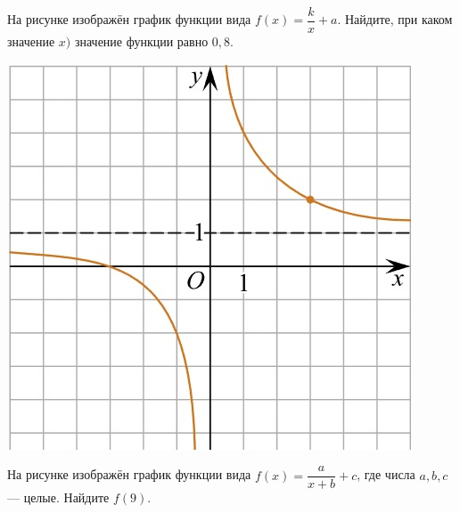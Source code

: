 \begin{class}[number=5]
	\begin{listofex}
		\newpage
		\item
		\begin{minipage}[t]{0.43\textwidth}
			На рисунке изображён график функции вида \(f(x)=\dfrac{k}{x}+a\). Найдите, при каком значение \(x)\) значение функции равно \(0,8\).
		\end{minipage}
		\begin{minipage}[c]{0.25\textwidth}
			\includegraphics[align=t, width=\textwidth]{pics/G101M4C5-1.jpg}
		\end{minipage}
		\item
		\begin{minipage}[t]{0.43\textwidth}
			На рисунке изображён график функции вида \(f(x)=\dfrac{a}{x+b}+c\), где числа \(a, b, c\) --- целые. Найдите \(f(9)\).
		\end{minipage}
		\begin{minipage}[c]{0.25\textwidth}

\end{minipage}
\end{listofex}
\end{class}
